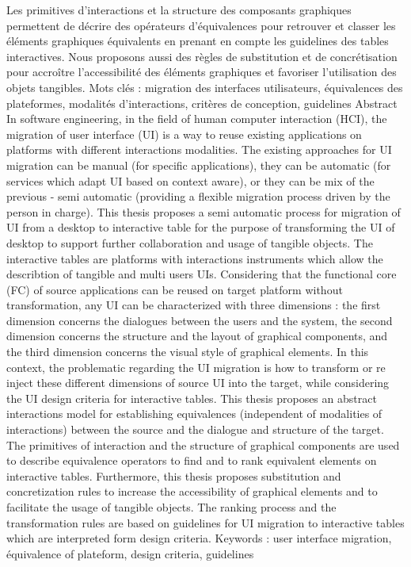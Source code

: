 \documentclass{article}
\begin{document}
Les primitives d’interactions et la structure des composants graphiques permettent de d\'{e}crire des op\'{e}rateurs
d’\'{e}quivalences pour retrouver et classer les \'{e}l\'{e}ments graphiques \'{e}quivalents en prenant en compte les guidelines des tables interactives. Nous proposons aussi des r\`{e}gles de substitution et de concr\'{e}tisation pour accro\^{i}tre
l’accessibilit\'{e} des \'{e}l\'{e}ments graphiques et favoriser l’utilisation des objets tangibles.
Mots cl\'{e}s :
migration des interfaces utilisateurs, \'{e}quivalences des plateformes, modalit\'{e}s d’interactions,
crit\`{e}res de conception, guidelines
Abstract
In software engineering, in the ﬁeld of human computer interaction (HCI), the migration of user interface
(UI) is a way to reuse existing applications on platforms with different interactions modalities. The existing
approaches for UI migration can be manual (for speciﬁc applications), they can be automatic (for services
which adapt UI based on context aware), or they can be mix of the previous - semi automatic (providing a
ﬂexible migration process driven by the person in charge).
This thesis proposes a semi automatic process for migration of UI from a desktop to interactive table for the
purpose of transforming the UI of desktop to support further collaboration and usage of tangible objects. The
interactive tables are platforms with interactions instruments which allow the describtion of tangible and multi
users UIs. Considering that the functional core (FC) of source applications can be reused on target platform
without transformation, any UI can be characterized with three dimensions : the ﬁrst dimension concerns the
dialogues between the users and the system, the second dimension concerns the structure and the layout of
graphical components, and the third dimension concerns the visual style of graphical elements. In this context,
the problematic regarding the UI migration is how to transform or re inject these different dimensions of source
UI into the target, while considering the UI design criteria for interactive tables.
This thesis proposes an abstract interactions model for establishing equivalences (independent of modalities
of interactions) between the source and the dialogue and structure of the target. The primitives of interaction and
the structure of graphical components are used to describe equivalence operators to ﬁnd and to rank equivalent
elements on interactive tables. Furthermore, this thesis proposes substitution and concretization rules to increase
the accessibility of graphical elements and to facilitate the usage of tangible objects. The ranking process and
the transformation rules are based on guidelines for UI migration to interactive tables which are interpreted
form design criteria.
Keywords :
user interface migration, \'{e}quivalence of plateform, design criteria, guidelines
\end{document}
